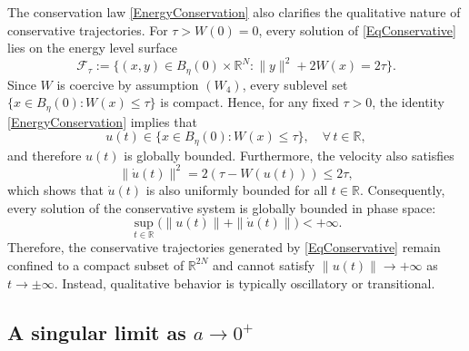 \documentclass[12pt]{amsart}
\numberwithin{equation}{section}
\begin{document}
The conservation law \eqref{EnergyConservation} also clarifies the qualitative nature of conservative trajectories. For $\tau>W(0)=0$, every solution of \eqref{EqConservative} lies on the energy level surface
$$
\mathcal{F}_\tau:= \Big\{(x,y)\in B_\eta(0)\times \mathbb{R}^N : \|y\|^2 + 2W(x) = 2\tau\Big\}.
$$
Since $W$ is coercive by assumption \hyperlink{W4}{$(W_4)$}, every sublevel set $\{x\in B_\eta(0) : W(x)\le \tau\}$ is compact. Hence, for any fixed $\tau>0$, the identity \eqref{EnergyConservation} implies that
$$
u(t)\in \{x\in B_\eta(0) : W(x)\le\tau\},\quad \forall\, t\in\mathbb{R},
$$
and therefore $u(t)$ is globally bounded. Furthermore, the velocity also satisfies
$$
\|\dot{u}(t)\|^2 = 2(\tau - W(u(t))) \le 2\tau,
$$
which shows that $\dot{u}(t)$ is also uniformly bounded for all $t\in\mathbb{R}$. Consequently, every solution of the conservative system is globally bounded in phase space:
$$
\sup_{t\in\mathbb{R}}\Big( \|u(t)\| + \|\dot{u}(t)\| \Big)<+\infty.
$$
Therefore, the conservative trajectories generated by \eqref{EqConservative} remain confined to a compact subset of $\mathbb{R}^{2N}$ and cannot satisfy $\|u(t)\|\to+\infty$ as $t\to\pm \infty$. Instead, qualitative behavior is typically oscillatory or transitional.

\subsection{A singular limit as $a\to 0^{+}$}
\end{document}
